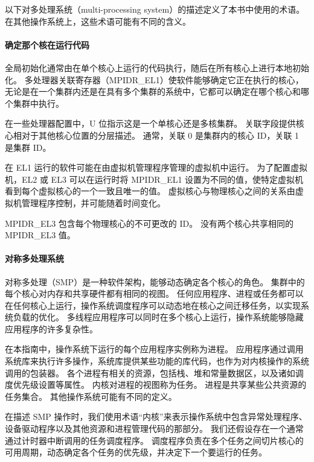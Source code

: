 以下对多处理系统（multi-processing system）的描述定义了本书中使用的术语。
在其他操作系统上，这些术语可能有不同的含义。

\paragraph{确定那个核在运行代码}

全局初始化通常由在单个核心上运行的代码执行，随后在所有核心上进行本地初始化。
多处理器关联寄存器（MPIDR\_EL1）使软件能够确定它正在执行的核心，无论是在一个集群内还是在具有多个集群的系统中，它都可以确定在哪个核心和哪个集群中执行。

在一些处理器配置中，U 位指示这是一个单核心还是多核集群。
关联字段提供核心相对于其他核心位置的分层描述。
通常，关联 0 是集群内的核心 ID，关联 1 是集群 ID。

\begin{Tcbox}[title={注意}]
在 EL1 运行的软件可能在由虚拟机管理程序管理的虚拟机中运行。
为了配置虚拟机，EL2 或 EL3 可以在运行时将 MPIDR\_EL1 设置为不同的值，使特定虚拟机看到每个虚拟核心的一个一致且唯一的值。
虚拟核心与物理核心之间的关系由虚拟机管理程序控制，并可能随着时间变化。

MPIDR\_EL3 包含每个物理核心的不可更改的 ID。
没有两个核心共享相同的 MPIDR\_EL3 值。
\end{Tcbox}

\paragraph{对称多处理系统}

对称多处理（SMP）是一种软件架构，能够动态确定各个核心的角色。
集群中的每个核心对内存和共享硬件都有相同的视图。
任何应用程序、进程或任务都可以在任何核心上运行，操作系统调度程序可以动态地在核心之间迁移任务，以实现系统负载的优化。
多线程应用程序可以同时在多个核心上运行，操作系统能够隐藏应用程序的许多复杂性。

在本指南中，操作系统下运行的每个应用程序实例称为进程。
应用程序通过调用系统库来执行许多操作，系统库提供某些功能的库代码，也作为对内核操作的系统调用的包装器。
各个进程有相关的资源，包括栈、堆和常量数据区，以及诸如调度优先级设置等属性。
内核对进程的视图称为任务。
进程是共享某些公共资源的任务集合。
其他操作系统可能有不同的定义。

在描述 SMP 操作时，我们使用术语“内核”来表示操作系统中包含异常处理程序、设备驱动程序以及其他资源和进程管理代码的那部分。
我们还假设存在一个通常通过计时器中断调用的任务调度程序。
调度程序负责在多个任务之间切片核心的可用周期，动态确定各个任务的优先级，并决定下一个要运行的任务。

